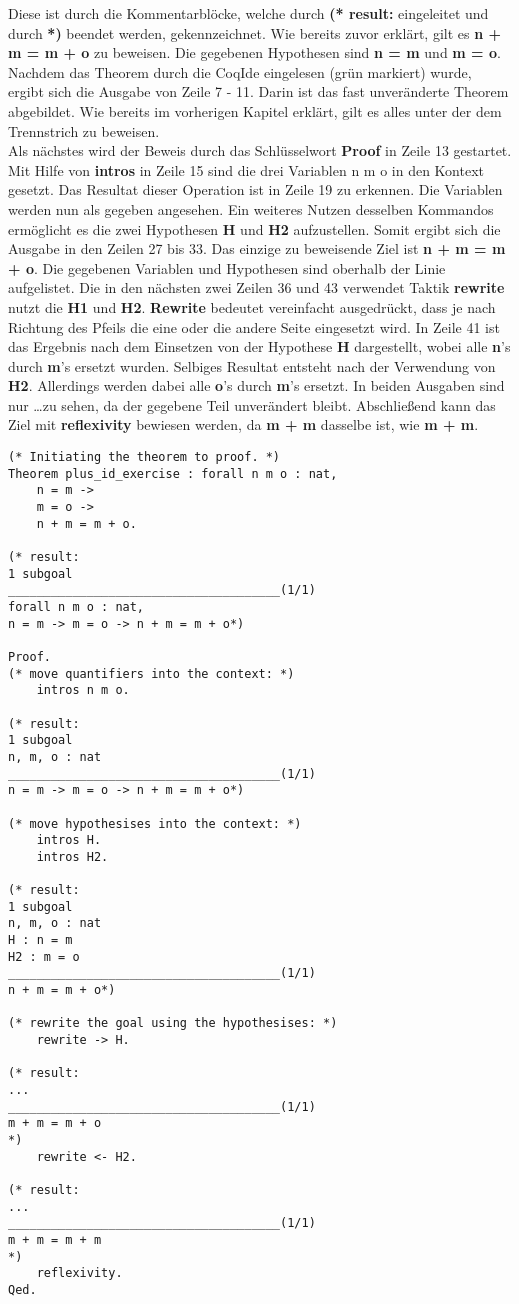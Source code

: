 Diese ist durch die Kommentarblöcke, welche durch \textbf{(* result:} eingeleitet und durch \textbf{*)} beendet werden, gekennzeichnet.
Wie bereits zuvor erklärt, gilt es \textbf{n + m = m + o} zu beweisen. Die gegebenen Hypothesen sind \textbf{n = m} und \textbf{m = o}. Nachdem das Theorem durch die CoqIde eingelesen (grün markiert) wurde, ergibt sich die Ausgabe von Zeile 7 - 11. Darin ist das fast unveränderte Theorem abgebildet. Wie bereits im vorherigen Kapitel erklärt, gilt es alles unter der dem Trennstrich zu beweisen.\\
Als nächstes wird der Beweis durch das Schlüsselwort \textbf{Proof} in Zeile 13 gestartet. Mit Hilfe von \textbf{intros} in Zeile 15 sind die drei Variablen n m o in den Kontext gesetzt. Das Resultat dieser Operation ist in Zeile 19 zu erkennen. Die Variablen werden nun als gegeben angesehen. Ein weiteres Nutzen desselben Kommandos ermöglicht es die zwei Hypothesen \textbf{H} und \textbf{H2} aufzustellen. Somit ergibt sich die Ausgabe in den Zeilen 27 bis 33. Das einzige zu beweisende Ziel ist \textbf{n + m = m + o}. Die gegebenen Variablen und Hypothesen sind oberhalb der Linie aufgelistet. Die in den nächsten zwei Zeilen 36 und 43 verwendet Taktik \textbf{rewrite} nutzt die \textbf{H1} und \textbf{H2}.
\textbf{Rewrite} bedeutet vereinfacht ausgedrückt, dass je nach Richtung des Pfeils die eine oder die andere Seite eingesetzt wird. In Zeile 41 ist das Ergebnis nach dem Einsetzen von der Hypothese \textbf{H} dargestellt, wobei alle \textbf{n}'s durch \textbf{m}'s ersetzt wurden. Selbiges Resultat entsteht nach der Verwendung von \textbf{H2}. Allerdings werden dabei alle \textbf{o}'s durch \textbf{m}'s ersetzt. In beiden Ausgaben sind nur \dots zu sehen, da der gegebene Teil unverändert bleibt.
Abschließend kann das Ziel mit \textbf{reflexivity} bewiesen werden, da \textbf{m + m} dasselbe ist, wie \textbf{m + m}.

\begin{lstlisting}[language=coq,firstnumber=1,caption=Coq Beispielbeweis,label=lst:sample-proof2]
(* Initiating the theorem to proof. *)
Theorem plus_id_exercise : forall n m o : nat,
	n = m ->
	m = o ->
	n + m = m + o.
	
(* result: 
1 subgoal
______________________________________(1/1)
forall n m o : nat,
n = m -> m = o -> n + m = m + o*)

Proof.
(* move quantifiers into the context: *)
	intros n m o. 
	
(* result: 
1 subgoal
n, m, o : nat
______________________________________(1/1)
n = m -> m = o -> n + m = m + o*)

(* move hypothesises into the context: *)	
	intros H.
	intros H2.

(* result: 
1 subgoal
n, m, o : nat
H : n = m
H2 : m = o
______________________________________(1/1)
n + m = m + o*)

(* rewrite the goal using the hypothesises: *)
	rewrite -> H.

(* result: 
...
______________________________________(1/1)
m + m = m + o
*)
	rewrite <- H2.

(* result:
...
______________________________________(1/1)
m + m = m + m
*)
	reflexivity.
Qed.
\end{lstlisting}

